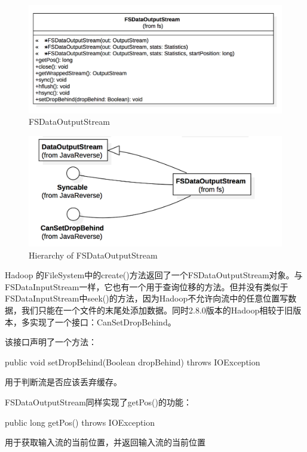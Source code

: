 \begin{figure}[h]
\centering
\includegraphics[width =1\linewidth]{1.png}
\caption{FSDataOutputStream}
\label{fig:FSDataOutputStream}
\end{figure}

\begin{figure}[h]
\centering
\includegraphics[width =1\linewidth]{2.png}
\caption{Hierarchy of FSDataOutputStream}
\label{fig:Hierarchy of FSDataOutputStream}
\end{figure}

Hadoop 的FileSystem中的create()方法返回了一个FSDataOutputStream对象。与FSDataInputStream一样，它也有一个用于查询位移的方法。但并没有类似于FSDataInputStream中seek()的方法，因为Hadoop不允许向流中的任意位置写数据，我们只能在一个文件的末尾处添加数据。同时2.8.0版本的Hadoop相较于旧版本，多实现了一个接口：CanSetDropBehind。

该接口声明了一个方法：
\begin{java}
public void setDropBehind(Boolean dropBehind) throws IOException
\end{java}
用于判断流是否应该丢弃缓存。

FSDataOutputStream同样实现了getPos()的功能：

\begin{java}
public long getPos() throws IOException
\end{java}
用于获取输入流的当前位置，并返回输入流的当前位置

